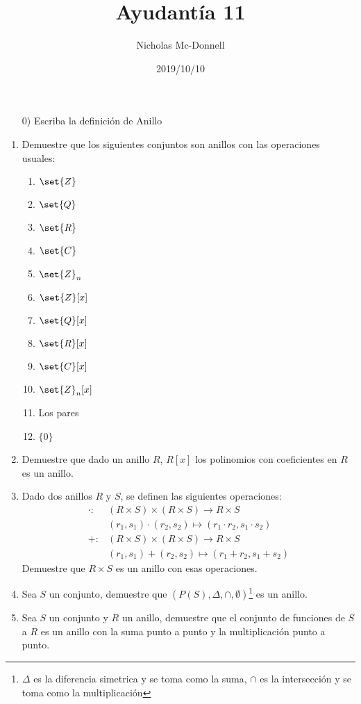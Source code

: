 \documentclass{ayudantia}
\title{Ayudantía 11}
\date{2019/10/10}
\author{Nicholas Mc-Donnell}
\begin{document}
\maketitle
\begin{itemize}
    \item[0)] Escriba la definición de Anillo
\end{itemize}
\begin{enumerate}
    \item Demuestre que los siguientes conjuntos son anillos con las operaciones usuales:
    \begin{multicols}{4}
        \begin{enumerate}[label=(\alph*)]
            \item \(\set{Z}\)
            \item \(\set{Q}\)
            \item \(\set{R}\)
            \item \(\set{C}\)
            \item \(\set{Z}_n\)
            \item \(\set{Z}[x]\)
            \item \(\set{Q}[x]\)
            \item \(\set{R}[x]\)
            \item \(\set{C}[x]\)
            \item \(\set{Z}_n[x]\)
            \item Los pares
            \item \(\{0\}\)
        \end{enumerate}
    \end{multicols}
    \item Demuestre que dado un anillo \(R\), \(R[x]\) los polinomios con coeficientes en \(R\) es un anillo.
    \item Dado dos anillos \(R\) y \(S\), se definen las siguientes operaciones:
    \begin{align*}
        \cdot:&(R\times S)\times(R\times S)\rightarrow R\times S\\
        &(r_1,s_1)\cdot(r_2,s_2)\mapsto(r_1\cdot r_2,s_1\cdot s_2)\\
        +:&(R\times S)\times(R\times S)\rightarrow R\times S\\
        &(r_1,s_1)+(r_2,s_2)\mapsto(r_1+r_2,s_1+s_2)
    \end{align*}
    Demuestre que \(R\times S\) es un anillo con esas operaciones.
    \item Sea \(S\) un conjunto, demuestre que \((P(S),\Delta,\cap,\emptyset)\)\footnote{\(\Delta\) es la diferencia simetrica y se toma como la suma, \(\cap\) es la intersección y se toma como la multiplicación} es un anillo.
    \item Sea \(S\) un conjunto y \(R\) un anillo, demuestre que el conjunto de funciones de \(S\) a \(R\) es un anillo con la suma punto a punto y la multiplicación punto a punto.
\end{enumerate}
\end{document}
